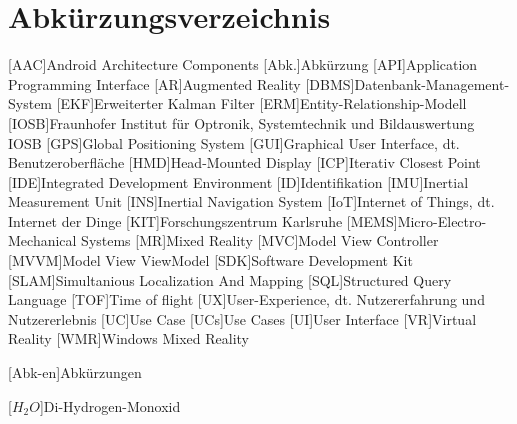 
\chapter*{Abkürzungsverzeichnis}                   %

\begin{acronym}[DHBW]
  [AAC]{Android Architecture Components}
  [Abk.]{Abkürzung}
  [API]{Application Programming Interface}
  [AR]{Augmented Reality}
  [DBMS]{Datenbank-Management-System}
  [EKF]{Erweiterter Kalman Filter}
  [ERM]{Entity-Relationship-Modell}
  [IOSB]{Fraunhofer Institut für Optronik, Systemtechnik und Bildauswertung IOSB}
  [GPS]{Global Positioning System}
  [GUI]{Graphical User Interface, dt. Benutzeroberfläche}
  [HMD]{Head-Mounted Display}
  [ICP]{Iterativ Closest Point}
  [IDE]{Integrated Development Environment}
  [ID]{Identifikation}
  [IMU]{Inertial Measurement Unit}
  [INS]{Inertial Navigation System}
  [IoT]{Internet of Things, dt. Internet der Dinge}
  [KIT]{Forschungszentrum Karlsruhe}
  [MEMS]{Micro-Electro-Mechanical Systems}
  [MR]{Mixed Reality}
  [MVC]{Model View Controller}
  [MVVM]{Model View ViewModel}
  [SDK]{Software Development Kit}
  [SLAM]{Simultanious Localization And Mapping}
  [SQL]{Structured Query Language}
  [TOF]{Time of flight}
  [UX]{User-Experience, dt. Nutzererfahrung und Nutzererlebnis}
  [UC]{Use Case}
  [UCs]{Use Cases}
  [UI]{User Interface}
  [VR]{Virtual Reality}
  [WMR]{Windows Mixed Reality}

  [Abk-en]{Abkürzungen}


  [\ensuremath{H_2O}]{Di-Hydrogen-Monoxid}

\end{acronym}
